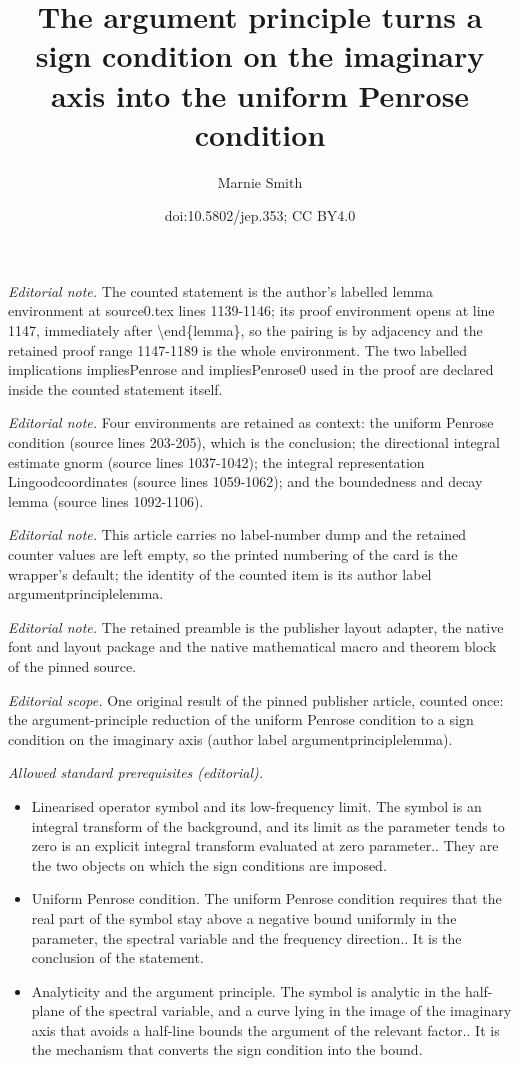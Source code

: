 \documentclass[10pt,a4paper]{article}
\title{The argument principle turns a sign condition on the imaginary axis into the uniform Penrose condition}
\author{Marnie Smith}
\date{doi:10.5802/jep.353; CC BY4.0}
\theoremstyle{plain}
\theoremstyle{remark}
\begin{document}
\maketitle
\noindent\textit{Editorial note.} The counted statement is the author's labelled lemma environment at source0.tex lines 1139-1146; its proof environment opens at line 1147, immediately after \textbackslash{}end\{lemma\}, so the pairing is by adjacency and the retained proof range 1147-1189 is the whole environment. The two labelled implications impliesPenrose and impliesPenrose0 used in the proof are declared inside the counted statement itself.\par\medskip
\noindent\textit{Editorial note.} Four environments are retained as context: the uniform Penrose condition (source lines 203-205), which is the conclusion; the directional integral estimate gnorm (source lines 1037-1042); the integral representation Lingoodcoordinates (source lines 1059-1062); and the boundedness and decay lemma (source lines 1092-1106).\par\medskip
\noindent\textit{Editorial note.} This article carries no label-number dump and the retained counter values are left empty, so the printed numbering of the card is the wrapper's default; the identity of the counted item is its author label argumentprinciplelemma.\par\medskip
\noindent\textit{Editorial note.} The retained preamble is the publisher layout adapter, the native font and layout package and the native mathematical macro and theorem block of the pinned source.\par\medskip
\noindent\textit{Editorial scope.} One original result of the pinned publisher article, counted once: the argument-principle reduction of the uniform Penrose condition to a sign condition on the imaginary axis (author label argumentprinciplelemma).\par\medskip
\noindent\textit{Allowed standard prerequisites (editorial).}\begin{itemize}
\item Linearised operator symbol and its low-frequency limit. The symbol is an integral transform of the background, and its limit as the parameter tends to zero is an explicit integral transform evaluated at zero parameter.. They are the two objects on which the sign conditions are imposed.
\item Uniform Penrose condition. The uniform Penrose condition requires that the real part of the symbol stay above a negative bound uniformly in the parameter, the spectral variable and the frequency direction.. It is the conclusion of the statement.
\item Analyticity and the argument principle. The symbol is analytic in the half-plane of the spectral variable, and a curve lying in the image of the imaginary axis that avoids a half-line bounds the argument of the relevant factor.. It is the mechanism that converts the sign condition into the bound.
\end{itemize}\medskip
\end{document}
